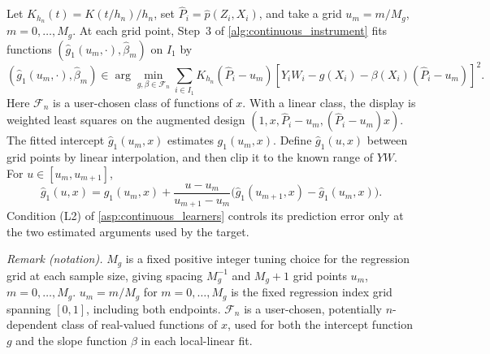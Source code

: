 Let $K_{h_n}(t)=K(t/h_n)/h_n$, set $\hat P_i=\hat p(Z_i,X_i)$, and take a grid $u_m=m/M_g$, $m=0,\ldots,M_g$. At each grid point, Step~3 of \cref{alg:continuous_instrument} fits functions $(\hat g_1(u_m,\cdot),\hat\beta_m)$ on $I_1$ by
    \begin{equation*}
        (\hat g_1(u_m,\cdot),\hat\beta_m)
        \in\arg\min_{g,\beta\in\mathcal F_n}
        \sum_{i\in I_1}K_{h_n}(\hat P_i-u_m)
        \left[ Y_iW_i-g(X_i)-\beta(X_i)(\hat P_i-u_m)\right]^2.
    \end{equation*}
Here $\mathcal F_n$ is a user-chosen class of functions of $x$. With a linear class, the display is weighted least squares on the augmented design $(1,x,\hat P_i-u_m,(\hat P_i-u_m)x)$. The fitted intercept $\hat g_1(u_m,x)$ estimates $g_1(u_m,x)$. Define $\hat g_1(u,x)$ between grid points by linear interpolation, and then clip it to the known range of $YW$. For $u\in[u_m,u_{m+1}]$,
    \begin{equation*}
        \hat g_1(u,x)=\hat g_1(u_m,x)
        +\frac{u-u_m}{u_{m+1}-u_m}\bigl(\hat g_1(u_{m+1},x)-\hat g_1(u_m,x)\bigr).
    \end{equation*}
Condition (L2) of \cref{asp:continuous_learners} controls its prediction error only at the two estimated arguments used by the target.

\noindent\textit{Remark (notation).} $M_g$ is a fixed positive integer tuning choice for the regression grid at each sample size, giving spacing $M_g^{-1}$ and $M_g+1$ grid points $u_m$, $m=0,\ldots,M_g$. $u_m=m/M_g$ for $m=0,\ldots,M_g$ is the fixed regression index grid spanning $[0,1]$, including both endpoints. $\mathcal F_n$ is a user-chosen, potentially $n$-dependent class of real-valued functions of $x$, used for both the intercept function $g$ and the slope function $\beta$ in each local-linear fit.


